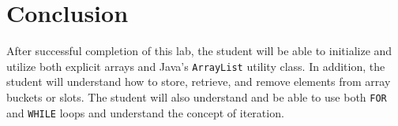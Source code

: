 \section{Conclusion}

After successful completion of this lab, the student will be able to initialize and utilize both explicit arrays and Java's {\tt ArrayList} utility class.  In addition, the student will understand how to store, retrieve, and remove elements from array buckets or slots. The student will also understand and be able to use both {\tt FOR} and {\tt WHILE} loops and understand the concept of iteration.
